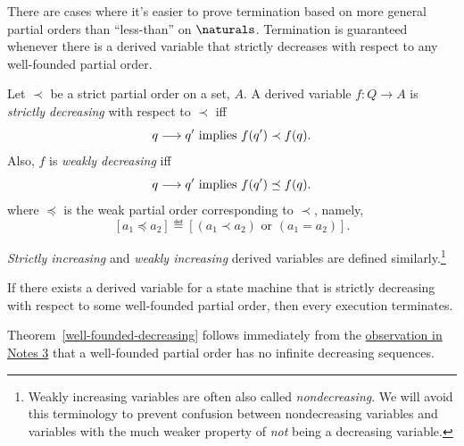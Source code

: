 \iffalse

There are cases where it's easier to prove termination based on more
general partial orders than ``less-than'' on $\naturals$.  Termination is
guaranteed whenever there is a derived variable that strictly decreases with
respect to any well-founded partial order.

\begin{definition}
Let $\prec$ be a strict partial order on a set, $A$.  A derived variable
$f : Q \to A$ is \emph{strictly decreasing} with respect to $\prec$ iff
\[
q \mathrel{\longrightarrow} q' \text{ implies } f(q') \prec f(q).
\]
Also, $f$ is \emph{weakly decreasing} iff
\[
q \mathrel{\longrightarrow} q' \text{  implies  } f(q') \preceq f(q).
\]
where $\preceq$ is the weak partial order corresponding to $\prec$,
namely,
\[
[a_1 \preceq a_2] \eqdef [(a_1 \prec a_2) \text{ or } (a_1=a_2)].
\]

\emph{Strictly increasing} and \emph{weakly increasing} derived variables
are defined similarly.\footnote{Weakly increasing variables are often also
called \emph{nondecreasing}.  We will avoid this terminology to prevent
confusion between nondecreasing variables and variables with the much
weaker property of \emph{not} being a decreasing variable.}
\end{definition}

\begin{theorem}\label{well-founded-decreasing}
  If there exists a derived variable for a state machine that is strictly
  decreasing with respect to some well-founded partial order, then every
  execution terminates.
\end{theorem}

Theorem~\ref{well-founded-decreasing} follows immediately from the
\href{http://courses.csail.mit.edu/6.042/spring08/ln3.pdf#infinite.decreasing}
{observation in Notes 3} that a well-founded partial order has no infinite
decreasing sequences.

